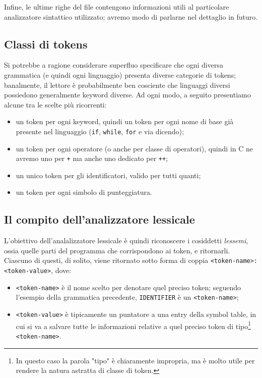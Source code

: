 \documentclass[class=book, crop=false, oneside, 12pt]{standalone}
\begin{document}
Infine, le ultime righe del file contengono informazioni utili al particolare analizzatore sintattico utilizzato; avremo modo di parlarne nel dettaglio in futuro.

\subsection{Classi di tokens}
Si potrebbe a ragione considerare superfluo specificare che ogni diversa grammatica (e quindi ogni linguaggio) presenta diverse categorie di tokens; banalmente, il lettore è probabilmente ben cosciente che linguaggi diversi possiedono generalmente keyword diverse. Ad ogni modo, a seguito presentiamo alcune tra le scelte più ricorrenti:
\begin{itemize}
    \item un token per ogni keyword, quindi un token per ogni nome di base già presente nel linguaggio (\texttt{if}, \texttt{while}, \texttt{for} e via dicendo);
    \item un token per ogni operatore (o anche per classe di operatori), quindi in C ne avremo uno per \texttt{+} ma anche uno dedicato per \texttt{++}; 
    \item un unico token per gli identificatori, valido per tutti quanti;
    \item un token per ogni simbolo di punteggiatura. 
\end{itemize}

\subsection{Il compito dell'analizzatore lessicale}
L'obiettivo dell'analalizzatore lessicale è quindi riconoscere i cosiddetti \emph{lessemi}, ossia quelle parti del programma che corrispondono ai token, e ritornarli. Ciascuno di questi, di solito, viene ritornato sotto forma di coppia \texttt{<token-name>: <token-value>}, dove:
\begin{itemize}
    \item \texttt{<token-name>} è il nome scelto per denotare quel preciso token; seguendo l'esempio della grammatica precedente, \texttt{IDENTIFIER} è un \texttt{<token-name>};
    \item \texttt{<token-value>} è tipicamente un puntatore a una entry della symbol table, in cui si va a salvare tutte le informazioni relative a quel preciso token di tipo\footnote{In questo caso la parola "tipo" è chiaramente impropria, ma è molto utile per rendere la natura astratta di classe di token.} \texttt{<token-name>}.
\end{itemize}
\end{document}
